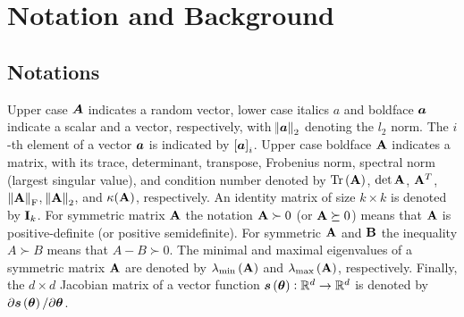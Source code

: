 \section{Notation and Background}\label{sec:background}
\subsection{Notations}

Upper case 
$\randomvec{A}$ indicates a random vector, lower case italics $a$ and boldface $\bm{a}$ indicate a scalar and a vector, respectively, with $\norm{\bm{a}}_2$ denoting 
the $l_2$ norm. The $i$-th element of a vector $\bm{a}$ is indicated by $\left[{\bm{a}}\right]_i$. Upper case boldface $\mathbf{A}$ indicates a matrix, with its trace, determinant, transpose, Frobenius norm, spectral norm (largest singular value), and condition number denoted by $\mathrm{Tr}\left(\mathbf{A}\right)$, $\det{\mathbf{A}}$, %
$\mathbf{A}^T$, $\left\lVert\mathbf{A}\right\rVert_{\mathrm{F}}$, $\norm{\mathbf{A}}_2$, and $\kappa(\mathbf{A})$,
respectively.  An identity matrix of size $k\times k$ is denoted by $\mathbf{I}_k$. 
For symmetric matrix $\mathbf{A}$ the notation $\mathbf{A} \succ 0$ (or $\mathbf{A} \succeq 0$) means that $\mathbf{A}$ is positive-definite (or positive semidefinite). 
For symmetric $\mathbf{A}$ and $\mathbf{B}$ the inequality $A \succ B$ means that $A-B \succ 0$. 
The minimal and maximal eigenvalues of a symmetric matrix $\mathbf{A}$ are denoted by $\lambda_{\mathrm{min}}\left(\mathbf{A}\right)$ and $\lambda_{\mathrm{max}}\left(\mathbf{A}\right)$, respectively. {Finally, the $d \times d$ Jacobian matrix of a vector function $\bm{s}\left(\bm{\theta}\right): \mathbb{R}^d \rightarrow \mathbb{R}^d $ is denoted by $\partial \bm{s}\left(\bm{\theta}\right) / \partial \bm{\theta}$.}




